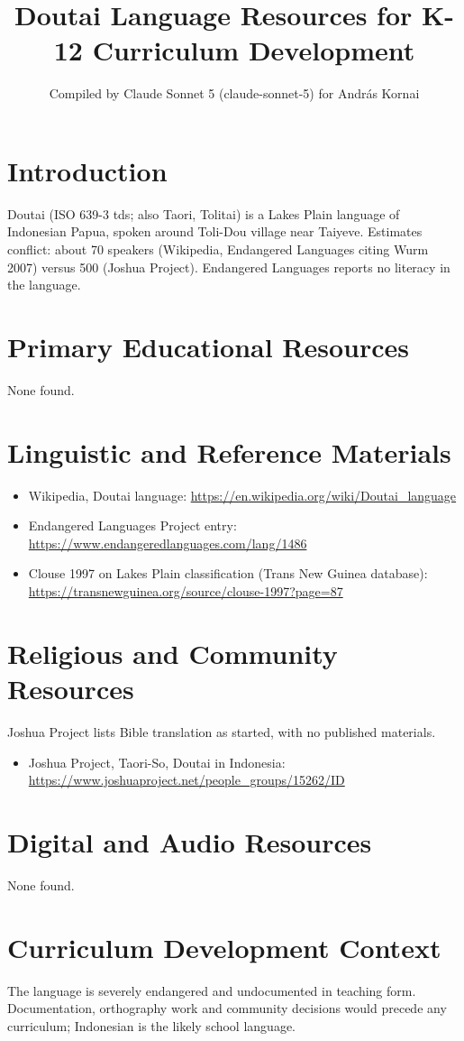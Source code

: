 \documentclass[12pt]{article}
\title{Doutai Language Resources for K-12 Curriculum Development}
\author{Compiled by Claude Sonnet 5 (claude-sonnet-5) for Andr\'as Kornai}
\date{}
\begin{document}
\maketitle
\section{Introduction}
Doutai (ISO 639-3 tds; also Taori, Tolitai) is a Lakes Plain language of Indonesian Papua, spoken around Toli-Dou village near Taiyeve. Estimates conflict: about 70 speakers (Wikipedia, Endangered Languages citing Wurm 2007) versus 500 (Joshua Project). Endangered Languages reports no literacy in the language.
\section{Primary Educational Resources}
None found.
\section{Linguistic and Reference Materials}
\begin{itemize}
\item Wikipedia, Doutai language: \url{https://en.wikipedia.org/wiki/Doutai_language}
\item Endangered Languages Project entry: \url{https://www.endangeredlanguages.com/lang/1486}
\item Clouse 1997 on Lakes Plain classification (Trans New Guinea database): \url{https://transnewguinea.org/source/clouse-1997?page=87}
\end{itemize}
\section{Religious and Community Resources}
Joshua Project lists Bible translation as started, with no published materials.
\begin{itemize}
\item Joshua Project, Taori-So, Doutai in Indonesia: \url{https://www.joshuaproject.net/people_groups/15262/ID}
\end{itemize}
\section{Digital and Audio Resources}
None found.
\section{Curriculum Development Context}
The language is severely endangered and undocumented in teaching form. Documentation, orthography work and community decisions would precede any curriculum; Indonesian is the likely school language.
\end{document}
